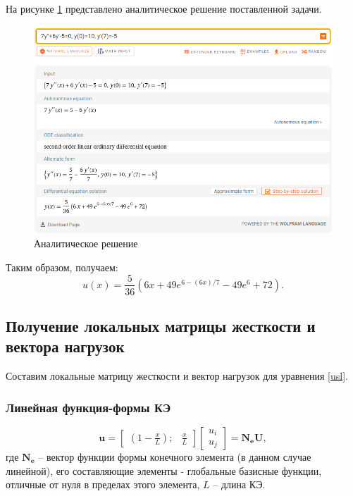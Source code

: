 На рисунке \ref{analit} представлено аналитическое решение поставленной задачи.
\begin{figure}[!h]
\begin{center}
\includegraphics[scale = 0.5]{labs/img/img1}
\end{center}
\caption{Аналитическое решение}
\label{analit}
\end{figure}

Таким образом, получаем:
$$
u(x)=\frac{5}{36}\left(6 x+49 e^{6-(6 x) / 7}-49 e^6+72\right).
$$


\subsection{Получение локальных матрицы жесткости и вектора нагрузок}

Составим локальные матрицу жесткости и вектор нагрузок для уравнения \ref{usl}.

\subsubsection{Линейная функция-формы КЭ}

$$
\mathbf{u}=\begin{bmatrix}
(1-\frac{x}{L}) ; & \frac{x}{L}
\end{bmatrix}
\begin{bmatrix}
u_i \\
u_j
\end{bmatrix}
=\mathbf{N_eU},
$$
где $\mathbf{N_e}$ -- вектор функции формы конечного элемента (в данном случае линейной), его составляющие элементы - глобальные базисные функции, отличные от нуля в пределах этого элемента, $L$ -- длина КЭ.

